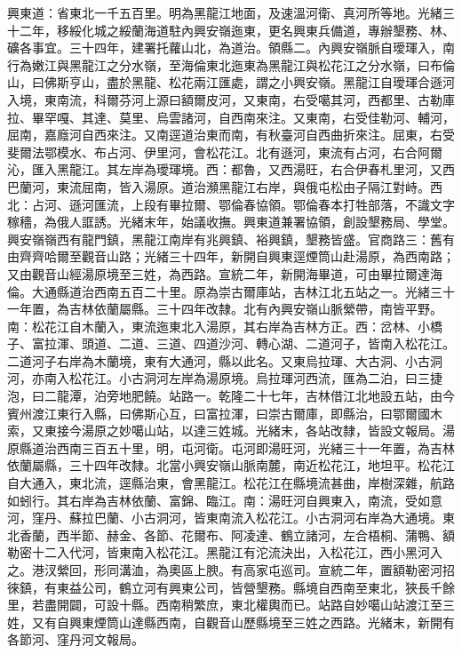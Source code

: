 \begin{pinyinscope}
興東道：省東北一千五百里。明為黑龍江地面，及速溫河衛、真河所等地。光緒三十二年，移綏化城之綏蘭海道駐內興安嶺迤東，更名興東兵備道，專辦墾務、林、礦各事宜。三十四年，建署托蘿山北，為道治。領縣二。內興安嶺脈自璦琿入，南行為嫩江與黑龍江之分水嶺，至海倫東北迤東為黑龍江與松花江之分水嶺，曰布倫山，曰佛斯亨山，盡於黑龍、松花兩江匯處，謂之小興安嶺。黑龍江自璦琿合遜河入境，東南流，科爾芬河上源曰額爾皮河，又東南，右受噶其河，西都里、古勒庫拉、畢罕嘎、其達、莫里、烏雲諸河，自西南來注。又東南，右受佳勒河、輔河，屈南，嘉廕河自西來注。又南逕道治東而南，有秋臺河自西曲折來注。屈東，右受斐爾法鄂模水、布占河、伊里河，會松花江。北有遜河，東流有占河，右合阿爾沁，匯入黑龍江。其左岸為璦琿境。西：都魯，又西湯旺，右合伊春札里河，又西巴蘭河，東流屈南，皆入湯原。道治瀕黑龍江右岸，與俄屯松由子隔江對峙。西北：占河、遜河匯流，上段有畢拉爾、鄂倫春協領。鄂倫春本打牲部落，不識文字稼穡，為俄人誆誘。光緒末年，始議收撫。興東道兼署協領，創設墾務局、學堂。興安嶺嶺西有龍門鎮，黑龍江南岸有兆興鎮、裕興鎮，墾務皆盛。官商路三：舊有由齊齊哈爾至觀音山路；光緒三十四年，新開自興東逕煙筒山赴湯原，為西南路；又由觀音山經湯原境至三姓，為西路。宣統二年，新開海畢道，可由畢拉爾達海倫。大通縣道治西南五百二十里。原為崇古爾庫站，吉林江北五站之一。光緒三十一年置，為吉林依蘭屬縣。三十四年改隸。北有內興安嶺山脈縈帶，南皆平野。南：松花江自木蘭入，東流迤東北入湯原，其右岸為吉林方正。西：岔林、小橋子、富拉渾、頭道、二道、三道、四道沙河、轉心湖、二道河子，皆南入松花江。二道河子右岸為木蘭境，東有大通河，縣以此名。又東烏拉琿、大古洞、小古洞河，亦南入松花江。小古洞河左岸為湯原境。烏拉琿河西流，匯為二泊，曰三捷泡，曰二龍潭，泊旁地肥饒。站路一。乾隆二十七年，吉林借江北地設五站，由今賓州渡江東行入縣，曰佛斯心互，曰富拉渾，曰崇古爾庫，即縣治，曰鄂爾國木索，又東接今湯原之妙噶山站，以達三姓城。光緒末，各站改隸，皆設文報局。湯原縣道治西南三百五十里，明，屯河衛。屯河即湯旺河，光緒三十一年置，為吉林依蘭屬縣，三十四年改隸。北當小興安嶺山脈南麓，南近松花江，地坦平。松花江自大通入，東北流，逕縣治東，會黑龍江。松花江在縣境流甚曲，岸樹深雜，航路如蚓行。其右岸為吉林依蘭、富錦、臨江。南：湯旺河自興東入，南流，受如意河，窪丹、蘇拉巴蘭、小古洞河，皆東南流入松花江。小古洞河右岸為大通境。東北香蘭，西半節、赫金、各節、花爾布、阿凌達、鶴立諸河，左合梧桐、蒲鴨、額勒密十二入代河，皆東南入松花江。黑龍江有沱流決出，入松花江，西小黑河入之。港汊縈回，形同溝洫，為奧區上腴。有高家屯巡司。宣統二年，置額勒密河招徠鎮，有東益公司，鶴立河有興東公司，皆營墾務。縣境自西南至東北，狹長千餘里，若盡開闢，可設十縣。西南稍繁庶，東北權輿而已。站路自妙噶山站渡江至三姓，又有自興東煙筒山達縣西南，自觀音山歷縣境至三姓之西路。光緒末，新開有各節河、窪丹河文報局。


\end{pinyinscope}
